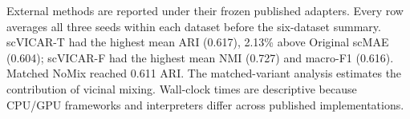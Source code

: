 
External methods are reported under their frozen published adapters. Every row averages all three seeds within each dataset before the six-dataset summary. scVICAR-T had the highest mean ARI (0.617), 2.13\% above Original scMAE (0.604); scVICAR-F had the highest mean NMI (0.727) and macro-F1 (0.616). Matched NoMix reached 0.611 ARI. The matched-variant analysis estimates the contribution of vicinal mixing. Wall-clock times are descriptive because CPU/GPU frameworks and interpreters differ across published implementations.
